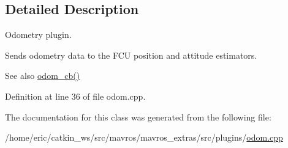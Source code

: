 \subsection{Detailed Description}
Odometry plugin. 

Sends odometry data to the F\+CU position and attitude estimators. \begin{DoxySeeAlso}{See also}
\mbox{\hyperlink{odomTf_8cpp_a586e030a1be1c3399ddff1672fd4cf5f}{odom\+\_\+cb()}} 
\end{DoxySeeAlso}


Definition at line 36 of file odom.\+cpp.



The documentation for this class was generated from the following file\+:\begin{DoxyCompactItemize}
\item 
/home/eric/catkin\+\_\+ws/src/mavros/mavros\+\_\+extras/src/plugins/\mbox{\hyperlink{odom_8cpp}{odom.\+cpp}}\end{DoxyCompactItemize}
